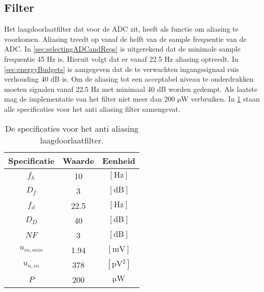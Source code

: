 \subsection{Filter}
Het laagdoorlaatfilter dat voor de ADC zit, heeft als functie om aliasing te voorkomen. Aliasing treedt op vanaf de helft van de sample frequentie van de ADC. In \cref{sec:selectingADCandReqs} is uitgerekend dat de minimale sample frequentie 45 Hz is. Hieruit volgt dat er vanaf 22.5 Hz aliasing optreedt. In \cref{sec:energyBudgets} is aangegeven dat de te verwachten ingangssignaal ruis verhouding 40 dB is. Om de aliasing tot een acceptabel niveau te onderdrukken moeten signalen vanaf 22.5 Hz met minimaal 40 dB worden gedempt. Als laatste mag de implementatie van het filter niet meer dan 200 $\si{\micro\watt}$ verbruiken. In \cref{tab:specsAAfilter} staan alle specificaties voor het anti aliasing filter samengevat.
\begin{table}[ht]
    \centering
    \begin{tabular}{c|c|c}
        Specificatie & Waarde & Eenheid \\\hline
        $f_h$       & 10   & $[\si{\hertz}]$ \\
        $D_f$       & 3    & $[\mathrm{dB}]$ \\
        $f_d$       & 22.5 & $[\si{\hertz}]$ \\
        $D_D$       & 40   & $[\mathrm{dB}]$ \\
        $NF$        & 3    & $[\mathrm{dB}]$ \\
        $u_{in,min}$& 1.94 & $[\si{\milli\volt}]$  \\
        $\overline{u_{n,in}}$ & 378 & $[\si{\pico\volt^2}]$\\
        $P$         & 200  & $\si{\micro\watt}$ \\
    \end{tabular}
    \caption{De specificaties voor het anti aliasing laagdoorlaatfilter.}
    \label{tab:specsAAfilter}
\end{table}


